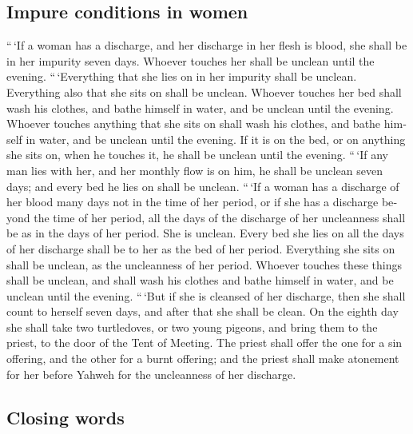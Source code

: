 \begin{paracol}{2}
\begin{otherlanguage}{english}
\hypertarget{impure-conditions-in-women}{%
\subsection{Impure conditions in
women}\label{impure-conditions-in-women}}

 ``\,`If a woman has a discharge, and her discharge in
her flesh is blood, she shall be in her impurity seven days. Whoever
touches her shall be unclean until the evening. 
``\,`Everything that she lies on in her impurity shall be unclean.
Everything also that she sits on shall be unclean. 
Whoever touches her bed shall wash his clothes, and bathe himself in
water, and be unclean until the evening.  Whoever touches
anything that she sits on shall wash his clothes, and bathe himself in
water, and be unclean until the evening.  If it is on the
bed, or on anything she sits on, when he touches it, he shall be unclean
until the evening.  ``\,`If any man lies with her, and
her monthly flow is on him, he shall be unclean seven days; and every
bed he lies on shall be unclean.  ``\,`If a woman has a
discharge of her blood many days not in the time of her period, or if
she has a discharge beyond the time of her period, all the days of the
discharge of her uncleanness shall be as in the days of her period. She
is unclean.  Every bed she lies on all the days of her
discharge shall be to her as the bed of her period. Everything she sits
on shall be unclean, as the uncleanness of her period. 
Whoever touches these things shall be unclean, and shall wash his
clothes and bathe himself in water, and be unclean until the evening.
 ``\,`But if she is cleansed of her discharge, then she
shall count to herself seven days, and after that she shall be clean.
 On the eighth day she shall take two turtledoves, or two
young pigeons, and bring them to the priest, to the door of the Tent of
Meeting.  The priest shall offer the one for a sin
offering, and the other for a burnt offering; and the priest shall make
atonement for her before Yahweh for the uncleanness of her discharge.

\hypertarget{closing-words}{%
\subsection{Closing words}\label{closing-words}}


\end{otherlanguage}
\end{paracol}
